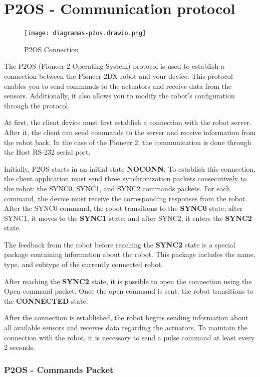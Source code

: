 \documentclass[../monografia.tex]{subfiles}
\begin{document}
\clearpage

\section{P2OS - Communication protocol}
\label{P2OS - Communication protocol}
\begin{figure}
    \centering
    \caption{P2OS Connection}
    \texttt{[image: diagramas-p2os.drawio.png]}
    \label{fig: P2OS Connection}
\end{figure}

The P2OS (Pioneer 2 Operating System) protocol is used to establish a connection between the Pioneer 2DX robot and your device. This protocol enables you to send commands to the actuators and receive data from the sensors. Additionally, it also allows you to modify the robot's configuration through the protocol.

At first, the client device must first establish a connection with the robot server. After it, the client can send commands to the server and receive information from the robot back. In the case of the Pioneer 2, the communication is done through the Host RS-232 serial port.

Initially, P2OS starts in an initial state \textbf{NOCONN}. To establish this connection, the client application must send three synchronization packets consecutively to the robot: the SYNC0, SYNC1, and SYNC2 commands packets. For each command, the device must receive the corresponding responses from the robot. After the SYNC0 command, the robot transitions to the \textbf{SYNC0} state; after SYNC1, it moves to the \textbf{SYNC1} state; and after SYNC2, it enters the \textbf{SYNC2} state.

The feedback from the robot before reaching the \textbf{SYNC2} state is a special package containing information about the robot. This package includes the name, type, and subtype of the currently connected robot.

After reaching the \textbf{SYNC2} state, it is possible to open the connection using the Open command packet. Once the open command is sent, the robot transitions to the \textbf{CONNECTED} state.


After the connection is established, the robot begins sending information about all available sensors and receives data regarding the actuators. To maintain the connection with the robot, it is necessary to send a pulse command at least every 2 seconds.

\subsubsection{P2OS - Commands Packet}
\end{document}
